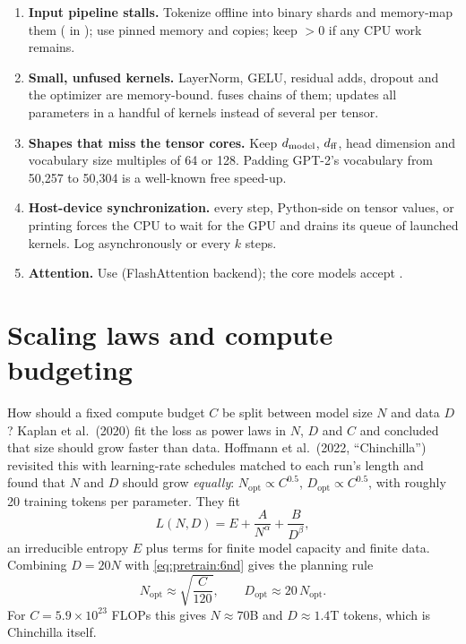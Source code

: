 \begin{systemslens}
\begin{enumerate}
\item \textbf{Input pipeline stalls.} Tokenize offline into binary shards and memory-map them
  ( in ); use pinned memory and
   copies; keep $>0$ if any CPU work remains.
\item \textbf{Small, unfused kernels.} LayerNorm, GELU, residual adds, dropout and the optimizer
  are memory-bound.  fuses chains of them;  updates
  all parameters in a handful of kernels instead of several per tensor.
\item \textbf{Shapes that miss the tensor cores.} Keep $d_{\text{model}}$, $d_{\text{ff}}$, head dimension and
  vocabulary size multiples of 64 or 128. Padding GPT-2's vocabulary from 50{,}257 to 50{,}304
  is a well-known free speed-up.
\item \textbf{Host-device synchronization.}  every step, Python-side
   on tensor values, or printing forces the CPU to wait for the GPU and drains its
  queue of launched kernels. Log asynchronously or every $k$ steps.
\item \textbf{Attention.} Use  (FlashAttention backend);
  the core models accept .
\end{enumerate}
\end{systemslens}

\section{Scaling laws and compute budgeting}\label{sec:pretrain:scaling}

How should a fixed compute budget $C$ be split between model size $N$ and data $D$? Kaplan et
al.\ (2020) fit the loss as power laws in $N$, $D$ and $C$ and concluded that size should grow
faster than data. Hoffmann et al.\ (2022, ``Chinchilla'') revisited this with learning-rate
schedules matched to each run's length and found that $N$ and $D$ should grow \emph{equally}:
$N_{\text{opt}}\propto C^{0.5}$, $D_{\text{opt}}\propto C^{0.5}$, with roughly 20 training
tokens per parameter. They fit
\begin{equation}
L(N,D) = E + \frac{A}{N^{\alpha}} + \frac{B}{D^{\beta}},
\end{equation}
an irreducible entropy $E$ plus terms for finite model capacity and finite data. Combining
$D=20N$ with \cref{eq:pretrain:6nd} gives the planning rule
\begin{equation}
N_{\text{opt}} \approx \sqrt{\frac{C}{120}}, \qquad D_{\text{opt}}\approx 20\,N_{\text{opt}}.
\end{equation}
For $C=5.9\times10^{23}$ FLOPs this gives $N\approx70$B and $D\approx1.4$T tokens, which is
Chinchilla itself.

